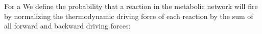 For a 
We define the probability that a reaction in the metabolic network will fire by normalizing the thermodynamic driving force of each reaction by the sum of all forward and backward driving forces: